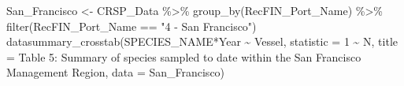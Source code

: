 \documentclass[
  letterpaper,
  DIV=11,
  numbers=noendperiod]{scrartcl}
\newenvironment{Shaded}{\begin{snugshade}}{\end{snugshade}}
\newcommand{\AttributeTok}[1]{\textcolor[rgb]{0.40,0.45,0.13}{#1}}
\newcommand{\DecValTok}[1]{\textcolor[rgb]{0.68,0.00,0.00}{#1}}
\newcommand{\FunctionTok}[1]{\textcolor[rgb]{0.28,0.35,0.67}{#1}}
\newcommand{\NormalTok}[1]{\textcolor[rgb]{0.00,0.23,0.31}{#1}}
\newcommand{\OtherTok}[1]{\textcolor[rgb]{0.00,0.23,0.31}{#1}}
\newcommand{\SpecialCharTok}[1]{\textcolor[rgb]{0.37,0.37,0.37}{#1}}
\newcommand{\StringTok}[1]{\textcolor[rgb]{0.13,0.47,0.30}{#1}}
\begin{document}
\begin{Shaded}
\begin{Highlighting}[]
\NormalTok{San\_Francisco }\OtherTok{\textless{}{-}}\NormalTok{ CRSP\_Data }\SpecialCharTok{\%\textgreater{}\%}
  \FunctionTok{group\_by}\NormalTok{(RecFIN\_Port\_Name) }\SpecialCharTok{\%\textgreater{}\%}
  \FunctionTok{filter}\NormalTok{(RecFIN\_Port\_Name }\SpecialCharTok{==} \StringTok{"4 {-} San Francisco"}\NormalTok{)}
\FunctionTok{datasummary\_crosstab}\NormalTok{(SPECIES\_NAME}\SpecialCharTok{*}\NormalTok{Year }\SpecialCharTok{\textasciitilde{}}\NormalTok{ Vessel, }\AttributeTok{statistic =} \DecValTok{1} \SpecialCharTok{\textasciitilde{}}\NormalTok{ N, }\AttributeTok{title =} \StringTok{\textquotesingle{}Table 5: Summary of species sampled to date within the San Francisco Management Region\textquotesingle{}}\NormalTok{, }\AttributeTok{data =}\NormalTok{ San\_Francisco)}
\end{Highlighting}
\end{Shaded}
\end{document}
